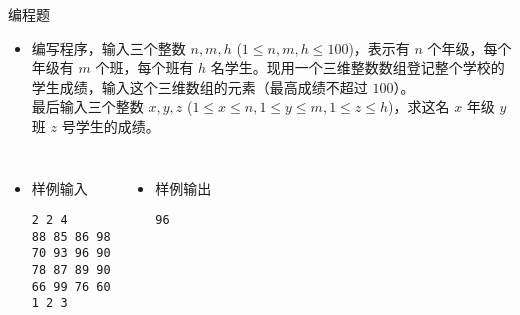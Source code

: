 \begin{frame}[fragile]
{\begin{exampleblock}{编程题}
            \begin{itemize}
                \item 编写程序，输入三个整数 $n, m, h$ ($1 \le n, m, h \le 100$)，表示有 $n$ 个年级，每个年级有 $m$ 个班，每个班有 $h$ 名学生。现用一个三维整数数组登记整个学校的学生成绩，输入这个三维数组的元素（最高成绩不超过 $100$）。\\
                最后输入三个整数 $x, y, z$  ($1 \le x \le n, 1 \le y \le m, 1 \le z \le h$)，求这名 $x$ 年级 $y$ 班 $z$ 号学生的成绩。
            \end{itemize}

            \begin{columns}[onlytextwidth,T]
                \begin{itemize}
                    \item 样例输入
    
                        \lstinline|2 2 4|\\
                        \lstinline|88 85 86 98|\\
                        \lstinline|70 93 96 90|\\
                        \lstinline|78 87 89 90|\\
                        \lstinline|66 99 76 60|\\
                        \lstinline|1 2 3|\\
                \end{itemize}

                \begin{itemize}
                    \item 样例输出
    
                        \lstinline|96|
                \end{itemize}
            \end{columns}

        \end{exampleblock}
    }
\end{frame}

